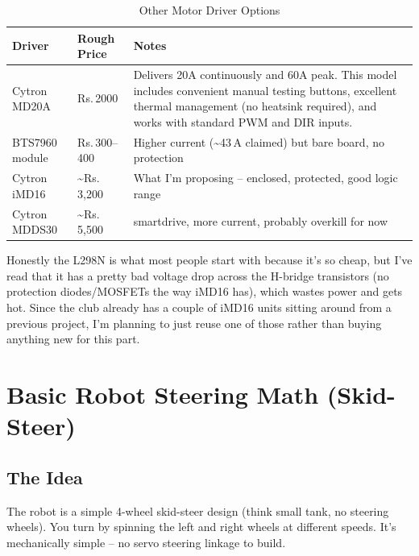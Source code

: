 \documentclass[12pt,a4paper]{article}
\begin{document}
\begin{table}[ht]
\centering
\caption{Other Motor Driver Options}
\label{tab:competitive}
\renewcommand{\arraystretch}{1.3}
\begin{tabular}{@{}lll@{}}
\toprule
\textbf{Driver} & \textbf{Rough Price} & \textbf{Notes} \\
\midrule
Cytron MD20A        & Rs.\,2000  &  Delivers 20A continuously and 60A peak. This model includes convenient manual testing buttons, excellent thermal management (no heatsink required), and works with standard PWM and DIR inputs. \\
BTS7960 module       & Rs.\,300--400  & Higher current (\textasciitilde43\,A claimed) but bare board, no protection \\
Cytron iMD16         & \textasciitilde Rs.\,3{,}200 & What I'm proposing -- enclosed, protected, good logic range \\
Cytron MDDS30        & \textasciitilde Rs.\,5{,}500 & smartdrive, more current, probably overkill for now \\
\bottomrule
\end{tabular}
\end{table}

Honestly the L298N is what most people start with because it's so cheap, but I've read
that it has a pretty bad voltage drop across the H-bridge transistors (no protection
diodes/MOSFETs the way iMD16 has), which wastes power and gets hot. Since the club
already has a couple of iMD16 units sitting around from a previous project, I'm planning
to just reuse one of those rather than buying anything new for this part.

\section{Basic Robot Steering Math (Skid-Steer)}

\subsection{The Idea}

The robot is a simple 4-wheel skid-steer design (think small tank, no steering wheels).
You turn by spinning the left and right wheels at different speeds. It's mechanically
simple -- no servo steering linkage to build.
\end{document}
